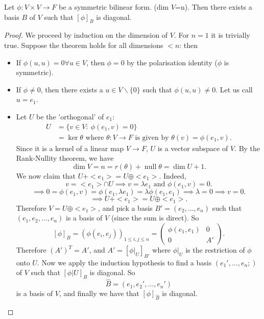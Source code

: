 \documentclass[a4paper]{scrartcl}
\begin{document}
\begin{theorem}
     Let $\phi: V \times V \rightarrow F$ be a symmetric bilinear form. (dim $V$=n). Then there exists a basis $B$ of $V$ such that $[\phi]_B$ is diagonal.
\end{theorem}
\begin{proof}
     We proceed by induction on the dimension of $V$. For $n=1$ it is trivially true. Suppose the theorem holds for all dimensions $<n$: then
     \begin{itemize}
         \item If $\phi (u,u)=0 \forall u \in V$, then $\phi=0$ by the polarisation identity ($\phi $ is symmetric).
         \item If $\phi \neq 0$, then there exists a $u \in V \backslash \{0\}$ such that $\phi (u,u) \neq 0$. Let us call $u=e_1$.
         \item Let $U$ be the 'orthogonal' of $e_1$: 
         \begin{equation*}
               \begin{split}
                    U&=\{v \in V: \ \phi (e_1,v)=0\}\\
                    &=\operatorname{ker} \theta \text{ where } \theta:V \rightarrow F \text{ is given by } \theta (v)= \phi (e_1,v).
               \end{split}
         \end{equation*}
         Since it is a kernel of a linear map $V \rightarrow F$, $U$ is a vector subspace of $V$. By the Rank-Nullity theorem, we have 
         \[\operatorname{dim} V=n= r(\theta)+ \operatorname{null}  \theta=\operatorname{dim}U+1.\]
         We now claim that $U+<e_1>=U \oplus <e_1>$. Indeed, 
         \[v= <e_1> \cap U \implies v= \lambda e_1 \text{ and }  \phi(e_1,v)=0 .\]
         \[\implies 0=\phi (e_1,v)=\phi (e_1, \lambda e_1)=\lambda \phi (e_1,e_1) \implies \lambda=0 \implies v=0.\]
         \[\implies U+<e_1>=U \oplus <e_1>.\]
         Therefore $V=U \oplus <e_1>$, and pick a basis $B'=(e_2, \ldots ,e_n)$ such that $(e_1, e_2, \ldots , e_n)$ is a basis of $V$ (since the sum is direct). So 
         \[[\phi]_B=(\phi(e_i,e_j))_{1 \leq i,j \leq n}=\left(
          \begin{array}{c|c}
          \phi (e_1,e_1) &0\\
            \hline
            0&A'
          \end{array}
          \right)
         .\]
         Therefore $(A')^T=A'$, and 
         $A'=[\phi|_U]_{B'}$ where $\phi|_U$ is the restriction of $\phi$ onto $U$. Now we apply the induction hypothesis to find a basis $(e_1', \ldots ,e_n;)$ of $V$ such that $[\phi|U]_{B}$ is diagonal. So 
         \[\hat{B}=(e_1,e_2',\ldots ,e_n')\] is a basis of $V$, and finally we have that $[\phi]_{\hat{B}}$ is diagonal.      
     \end{itemize}
\end{proof}
\end{document}
